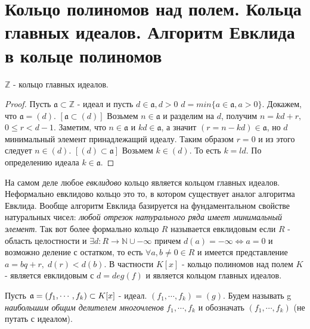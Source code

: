 \section{Кольцо полиномов над полем. Кольца главных идеалов. Алгоритм Евклида в кольце полиномов}

\begin{thm}
  $  \mathbb{Z} $ - кольцо главных идеалов. 
\end{thm}

\begin{proof}
  Пусть $ \mathfrak{a} \subset \mathbb{Z} $ - идеал и пусть $ d \in \mathfrak{a}, d > 0 $ \newline 
  $ d = min\{ a \in \mathfrak{a}, a > 0 \} $. Докажем, что $ \mathfrak{a} = (d) $. \newline
  $ [\mathfrak{a} \subset (d)] $ \newline
  Возьмем $ n \in \mathfrak{a} $ и разделим на $ d $, получим \newline $ n = kd + r, \; $ $ 0 \le r < d - 1 $. \newline
  Заметим, что $ n \in \mathfrak{a} $ и $ kd \in \mathfrak{a} $, а значит $ (r = n - kd) \in \mathfrak{a} $, но $ d $
  минимальный элемент принадлежащий идеалу. Таким образом $ r = 0 $ и из этого следует $ n \in (d) $. \newline
  $ [(d) \subset \mathfrak{a}] $ \newline
  Возьмем $ k \in (d) $. То есть $ k = ld $. По определению идеала $ k \in \mathfrak{a} $.
\end{proof}

На самом деле любое \emph{евклидово} кольцо является кольцом главных идеалов. Неформально евклидово 
кольцо это то, в котором существует аналог алгоритма Евклида. Вообще алгоритм Евклида базируется на
фундаментальном свойстве натуральных чисел: \emph{любой отрезок натурального ряда имеет минимальный элемент}.
Так вот более формально кольцо $ R $ называется евклидовым если $ R $ - область целостности и 
$ \exists d : R \rightarrow \mathbb{N} \cup -\infty $ причем $ d(a) = -\infty \Leftrightarrow a = 0 $ и 
возможно деление с остатком, то есть $ \forall a, b \ne 0 \in R $ и имеется представление $ a = bq + r, \;
d(r) < d(b) $. В частности $ K[x] $ - кольцо полиномов над полем
$ K $ - является евклидовым с $ d = deg(f) $ и является кольцом главных идеалов.

\begin{defn}
  Пусть $ \mathfrak{a} = (f_{1}, \cdots, f_{k}) \subset K[x] $ - идеал. \newline
  $ (f_{1}, \cdots, f_{k}) = (g) $. Будем называть g \emph{наибольшим общим делителем многочленов} 
  $ f_{1}, \cdots, f_{k} $ и обозначать $ (f_{1}, \cdots, f_{k}) $ (не путать с идеалом).
\end{defn}

